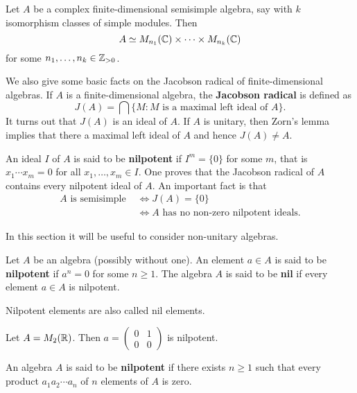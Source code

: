 \begin{theorem}
Let $A$ be a complex finite-dimensional semisimple algebra, say with  
$k$ isomorphism classes of simple modules. Then 
\[
A\simeq M_{n_1}(\mathbb{C})\times\cdots\times M_{n_k}(\mathbb{C})
\]
for some $n_1,\dots,n_k\in\mathbb{Z}_{>0}$.
\end{theorem}

We also give some basic facts on the Jacobson radical
of finite-dimensional algebras. If $A$ is a finite-dimensional algebra, the \textbf{Jacobson radical} is defined as 
\[
J(A)=\bigcap\{M:M\text{ is a maximal left ideal of $A$}\}. 
\]
It turns out that $J(A)$ is an ideal of $A$. If $A$ is
unitary, then Zorn's lemma implies that there a 
maximal left ideal of $A$ and hence $J(A)\ne A$. 

An ideal $I$ of $A$ is said to be \textbf{nilpotent}
if $I^m=\{0\}$ for some $m$, that is 
$x_1\cdots x_m=0$ for all $x_1,\dots,x_m\in I$. 
One proves that the Jacobson radical of $A$ 
contains every nilpotent ideal of $A$. An important
fact is that 
\begin{align*}
A\text{ is semisimple }
&\Longleftrightarrow 
J(A)=\{0\}\\
&\Longleftrightarrow 
A\text{ has no non-zero nilpotent ideals}.
\end{align*}

\label{Kolchin}

In this section it will be useful to consider 
non-unitary algebras. 

\begin{definition}
    Let $A$ be an algebra (possibly without one). An element $a\in A$
    is said to be \textbf{nilpotent} if 
    $a^n=0$ for some $n\geq1$. The algebra $A$ is said to be
    \textbf{nil} if every element $a\in A$ is nilpotent. 
\end{definition}

Nilpotent elements are also called nil elements.  

\begin{example}
    Let $A=M_2(\mathbb{R})$. Then $a=\begin{pmatrix}0&1\\0&0\end{pmatrix}$ is nilpotent. 
\end{example}

\begin{definition}
    An algebra $A$ is said to be \textbf{nilpotent} if there exists
    $n\geq1$ such that every product 
    $a_1a_2\cdots a_n$
    of $n$ elements of $A$ is zero. 
\end{definition}

